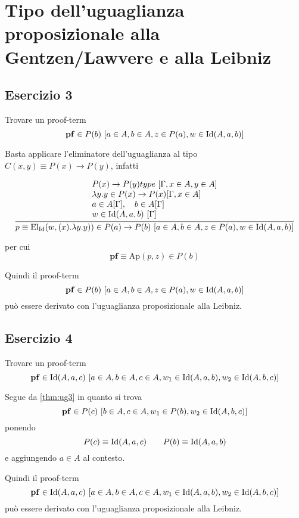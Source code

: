 \section{Tipo dell'uguaglianza proposizionale alla Gentzen/Lawvere e alla Leibniz}
\subsection{Esercizio 3}
\begin{thm}\label{thm:ug3} Trovare un proof-term
	\[ \mathbf{pf}\in P(b)\ [a\in A, b\in A, z\in P(a), w\in \mathrm{Id}(A, a, b)]\]
\end{thm}
\proof
Basta applicare l'eliminatore dell'uguaglianza al tipo $C(x,y) \equiv P(x)\to P(y)$, infatti
\begin{scriptsize}
	\[ \infer{p \equiv \mathrm{El}_{\mathrm{Id}}(w, (x).\lambda y. y)) \in P(a)\to P(b)\ [a \in A, b\in A, z\in P(a), w\in \Id{A}{a}{b}]}{\begin{array}{l}P(x)\to P(y) type\ [\Gamma, x \in A, y \in A] \\ \lambda y. y \in P(x) \to P(x)  [\Gamma, x \in A] \\
		a \in A [\Gamma], \quad b \in A [\Gamma] \\
		w \in \Id{A}{a}{b}\ [\Gamma] \end{array}} \]
\end{scriptsize}
per cui 
\[ \mathbf{pf} \equiv \mathrm{Ap}(p, z) \in P(b) \]
\endproof

Quindi il proof-term \[ \mathbf{pf}\in P(b)\ [a\in A, b\in A, z\in P(a), w\in \mathrm{Id}(A, a, b)]\] può essere derivato con l'uguaglianza proposizionale alla Leibniz.

\subsection{Esercizio 4}
\begin{thm}
	Trovare un proof-term
	\[ \mathbf{pf} \in \mathrm{Id}(A, a, c)\ [a\in A, b\in A, c\in A, w_1 \in \mathrm{Id}(A, a, b), w_2 \in \mathrm{Id}(A, b, c) ] \]
\end{thm}

\proof
Segue da \ref{thm:ug3} in quanto si trova
\[ \mathbf{pf} \in P(c)\ [b\in A, c \in A, w_1 \in P(b), w_2 \in \mathrm{Id}(A, b, c)] \]
ponendo
\[ P(c) \equiv \mathrm{Id}(A, a, c) \qquad P(b) \equiv \mathrm{Id}(A, a, b) \]
e aggiungendo $a\in A$ al contesto.
\endproof

Quindi il proof-term \[ \mathbf{pf} \in \mathrm{Id}(A, a, c)\ [a\in A, b\in A, c\in A, w_1 \in \mathrm{Id}(A, a, b), w_2 \in \mathrm{Id}(A, b, c) ] \] può essere derivato con l'uguaglianza proposizionale alla Leibniz.

